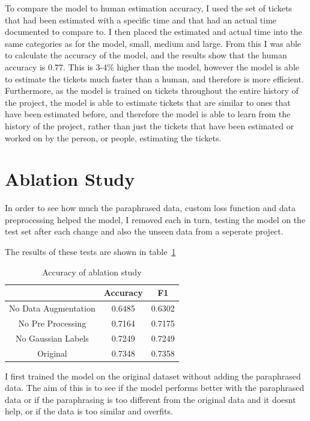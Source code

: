 \documentclass{UoYCSproject}
\begin{document}
    To compare the model to human estimation accuracy, I used the set of tickets that had been estimated with a specific time and that had an actual time documented to compare to.
    I then placed the estimated and actual time into the same categories as for the model, small, medium and large.
    From this I was able to calculate the accuracy of the model, and the results show that the human accuracy is 0.77.
    This is 3-4\% higher than the model, however the model is able to estimate the tickets much faster than a human, and therefore is more efficient.
    Furthermore, as the model is trained on tickets throughout the entire history of the project, the model is able to estimate tickets that are similar to ones that have been estimated before, and therefore the model is able to learn from the history of the project, rather than just the tickets that have been estimated or worked on by the person, or people, estimating the tickets.


    \section{Ablation Study}
    In order to see how much the paraphrased data, custom loss function and data preprocessing helped the model, I removed each in turn, testing the model on the test set after each change and also the unseen data from a seperate project.

    The results of these tests are shown in table~\ref{tab:accuracy-ablation} \par

\begin{table}[h]
\centering
\begin{tabular}{ccc}
    \toprule

                     & Accuracy   & F1         \\
    \midrule
No Data Augmentation & 0.6485 & 0.6302 \\
No Pre Processing    & 0.7164 & 0.7175 \\
No Gaussian Labels   & 0.7249 & 0.7249 \\
Original             & 0.7348  & 0.7358 \\
    \bottomrule
\end{tabular}
    \caption{Accuracy of ablation study} \label{tab:accuracy-ablation}

\end{table}

    I first trained the model on the original dataset without adding the paraphrased data. The aim of this is to see if the model performs better with the paraphrased data or if the paraphrasing is too different from the original data and it doesnt help, or if the data is too similar and overfits.
\end{document}
